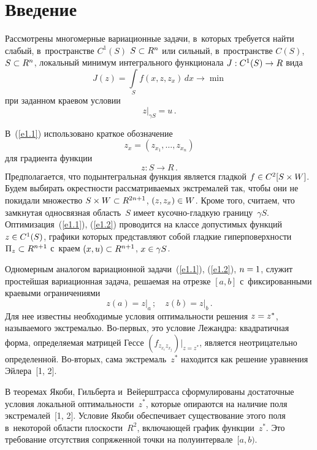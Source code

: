 \begin{multicols}{2}

\label{st\stat}
    
\section{Введение}

    Рассмотрены многомерные вариационные задачи, в~которых требуется найти 
слабый, в~пространстве $C^1(S)$ $S\hm\subset R^n$ или сильный, в~пространстве 
$C(S)$, $S\hm\subset R^n$, локальный минимум интегрального функционала 
    $J: C^1(S)\hm\to R$ вида 
    \begin{equation}
    J(z)=\int\limits_S f(x,z,z_x)\,dx\to \min
    \label{e1.1}
    \end{equation}
при заданном краевом условии
\begin{equation}
z \vert_{\gamma S} =u\,.
\label{e1.2}
\end{equation}
    
    В~(\ref{e1.1}) использовано краткое обозначение 
    $$
    z_x= \left(z_{x_1}, \ldots ,  z_{x_n}\right)
    $$ 
    для градиента функции 
    $$
    z: S\to R\,.
    $$
     Предполагается, что 
подынтегральная функция является гладкой $f\hm\in C^2[S\times W]$. Будем 
выбирать окрестности рассматриваемых экстремалей так, чтобы они не покидали 
множество $S\times W \hm\subset R^{2n+1}$, $(z,z_x)\hm\in W$. Кроме того, 
считаем, что замкнутая односвязная область~$S$ имеет ку\-соч\-но-глад\-кую 
границу~$\gamma S$. Оптимизация~(\ref{e1.1}), (\ref{e1.2}) проводится на классе 
допустимых функций $z\hm\in C^1(S)$, графики которых представляют собой 
гладкие гиперповерхности $\Pi_z\hm\subset R^{n+1}$ с~краем $(x,u)\hm\subset 
R^{n+1}$, $x\hm\in \gamma S$. 
    
    Одномерным аналогом вариационной задачи~(\ref{e1.1}), (\ref{e1.2}), 
$n\hm=1$, служит простейшая вариационная задача, решаемая на отрезке $[a,b]$ 
с~фиксированными краевыми ограничениями 
$$
z(a)= z\vert_a\,;\quad z(b)=  z\vert_b\,.
$$
 Для нее известны необходимые условия оптимальности решения $z\hm= 
z^*$, называемого экстремалью. Во-пер\-вых, это условие Лежандра: квадратичная 
форма, определяемая матрицей Гессе $(f_{z_{x_i}z_{x_j}})\vert_{z=z^*}$, является 
неотрицательно определенной. Во-вто\-рых, сама экстремаль~$z^*$ находится как 
решение уравнения Эйлера~[1, 2]. 
    
    В теоремах Якоби, Гильберта и~Вейерштрасса сформулированы достаточные 
условия локальной оптимальности~$z^*$, которые опираются на наличие поля 
экстремалей~[1, 2]. Условие Якоби обеспечивает существование этого поля 
в~некоторой области плоскости~$R^2$, включающей график функции~$z^*$. Это 
требование отсутствия сопряженной точки на полуинтервале~$[a, b)$.
    

\end{multicols}
